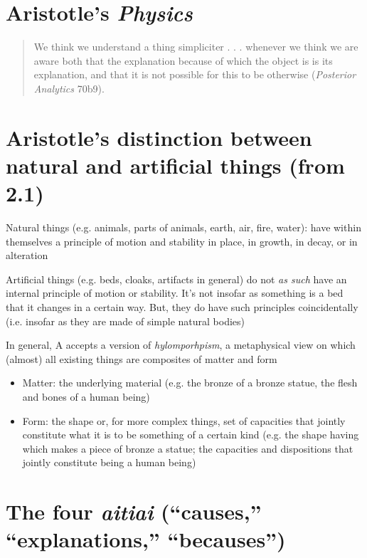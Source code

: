 \documentclass[oneside]{article}
\begin{document}
\thispagestyle{fancy}

\section*{Aristotle's \emph{Physics}}

\begin{quote}
We think we understand a thing simpliciter . . . whenever we think we are aware both that the explanation because of which the object is is its explanation, and that it is not possible for this to be otherwise (\emph{Posterior Analytics} 70b9).
\end{quote}



\section*{Aristotle's distinction between natural and artificial things (from 2.1)}

\noindent Natural things (e.g. animals, parts of animals, earth, air, fire, water): have within themselves a principle of motion and stability in place, in growth, in decay, or in alteration
\vspace*{2mm}

\noindent Artificial things (e.g. beds, cloaks, artifacts in general) do not \emph{as such} have an internal principle of motion or stability. It's not insofar as something is a bed that it changes in a certain way. But, they do have such principles coincidentally (i.e. insofar as they are made of simple natural bodies)
\vspace*{2mm}

\noindent In general, A accepts a version of \emph{hylomporhpism}, a metaphysical view on which (almost) all existing things are composites of matter and form
\begin{itemize}\item{Matter: the underlying material (e.g. the bronze of a bronze statue, the flesh and bones of a human being)}\item{Form: the shape or, for more complex things, set of capacities that jointly constitute what it is to be something of a certain kind (e.g. the shape having which makes a piece of bronze a statue; the capacities and dispositions that jointly constitute being a human being)}\end{itemize}

\section*{The four \emph{aitiai} (``causes,'' ``explanations,'' ``becauses'')}
\end{document}
